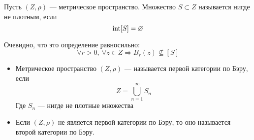 \begin{definition}
	Пусть $(Z, \rho)$ --- метрическое пространство. Множество $S \subset Z$ называется нигде не плотным, если 
	$$
	\operatorname{int} [S] = \varnothing
	$$
\end{definition}
\begin{remark}
	Очевидно, что это определение равносильно:
	$$
	\forall r > 0, \ \forall z \in Z \Rightarrow B_r(z) \nsubseteq [S]
	$$
\end{remark}
\begin{definition}
	\hfill 
	\begin{itemize}
		\item Метрическое пространство $(Z, \rho)$ --- называется первой категории по Бэру, если 
		$$
		Z = \bigcup_{n=1}^\infty S_n
		$$
		Где $S_n$ --- нигде не плотные множества
		\item Если $(Z, \rho)$ не является первой категории по Бэру, то оно называется второй категории по Бэру.
	\end{itemize} 
\end{definition}

